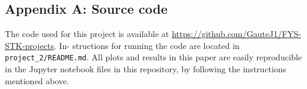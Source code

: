 \subsection{Appendix A: Source code}

The code used for this project is available at
\url{https://github.com/GauteJ1/FYS-STK-projects}. In-
structions for running the code are located in
\texttt{project\_2/README.md}. All plots and results in this paper
are easily reproducible in the Jupyter notebook files in
this repository, by following the instructions mentioned
above.
